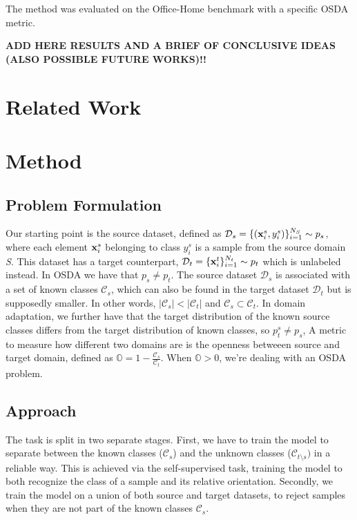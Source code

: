 \documentclass[10pt,twocolumn,letterpaper]{article}
\begin{document}
The method was evaluated on the Office-Home benchmark \cite{OfficeHomeDataset} with a specific OSDA metric.

{\bf ADD HERE RESULTS AND A BRIEF OF CONCLUSIVE IDEAS (ALSO POSSIBLE FUTURE WORKS)!!}

\section{Related Work}
\label{sec:relatedwork}


\section{Method}
\label{sec:method}

\subsection{Problem Formulation}
\label{sec:problemformulation}
Our starting point is the source dataset, 
defined as $\mathcal{D}_s = \{({\bf x}_i^s, y_i^s)\}_{i=1}^{N_S} \sim p_s$, 
where each element ${\bf x}_i^s$ belonging to class $y_i^s$ is a sample from the source domain {\it S}.
This dataset has a target counterpart, 
$\mathcal{D}_t = \{{\bf x}_i^t\}_{i=1}^{N_t} \sim p_t$ which is unlabeled instead.
In OSDA we have that $p_s \neq p_t$.
The source dataset $\mathcal{D}_s$ is associated with a set of known classes $\mathcal{C}_s$, 
which can also be found in the target dataset $\mathcal{D}_t$ but is supposedly smaller.
In other words,
$|\mathcal{C}_s| < |\mathcal{C}_t|$ and $\mathcal{C}_s \subset \mathcal{C}_t$.
In domain adaptation, 
we further have that the target distribution of the known source classes differs from the target distribution of known classes,
so $p_t^s \neq p_s$, 
A metric to measure how different two domains are is the openness betweeen source and target domain\cite{bendale2015open}, 
defined as $\displaystyle \mathbb{O} = 1-\frac{\mathcal{C}_s}{\mathcal{C}_t}$.
When $\mathbb{O} > 0$, we're dealing with an OSDA problem.

\subsection{Approach}
\label{sec:apporach}
The task is split in two separate stages.
First, 
we have to train the model to separate between the known classes ($\mathcal{C}_s$) and the unknown classes ($\mathcal{C}_{t\setminus s})$ in a reliable way.
This is achieved via the self-supervised task,
training the model to both recognize the class of a sample and its relative orientation.
Secondly,
we train the model on a union of both source and target datasets,
to reject samples when they are not part of the known classes $\mathcal{C}_s$.
\end{document}
